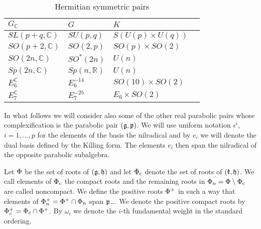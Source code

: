 \begin{table}[H]\label{fig:herm_pairs}
\begin{center}%
\begin{tabular}{llll}
$G_\mathbb{C}$ & {\centering $G$ }&  $K$\\\hline
$SL(p+q,\mathbb{C})$ & $SU(p,q)$ &$S(U(p)\times U(q))$\\
$SO(p+2,\mathbb{C})$ &  $SO(2,p)$ & $SO(p)\times SO(2)$\\
$SO(2n,\mathbb{C})$ &   $SO^*(2n)$ & $U(n)$\\
$Sp(2n,\mathbb{C})$ &   $Sp(n,\mathbb{R})$ & $U(n)$\\
$E_6^\mathbb{C}$ &   $E_6^{-14}$& $SO(10)\times SO(2)$\\
$E_7^\mathbb{C}$ &  $E_7^{-25} $ & $E_6\times SO(2)$
\end{tabular}\caption{Hermitian symmetric pairs}
\end{center}
\end{table}

 In what follows we will consider also some of the other real parabolic pairs whose complexification is the parabolic pair $(\mathfrak{g},\mathfrak{p})$. We will use uniform notation $\epsilon^i$, $i=1,\ldots,p$ for the elements of the basis the nilradical and by $e_i$ we will denote the dual basis defined  by the Killing form. The elements $e_i$ then span the nilradical of the opposite parabolic subalgebra. %

Let $\Phi$ be the set of roots of $(\mathfrak{g},\mathfrak{h})$ and let $\Phi_c$ denote the set of roots of $(\mathfrak{k},\mathfrak{h})$. We call elements of $\Phi_c$ the compact roots and the remaining roots in $\Phi_n = \Phi \setminus \Phi_c$ are called noncompact. We define the positive roots $\Phi^+$ in such a way that elements of $\Phi_n^+ = \Phi^+ \cap \Phi_n$ span $\mathfrak{p}_-$. We denote the positive compact roots by $\Phi^+_c = \Phi_c \cap \Phi^+$. By $\omega_i$ we denote the $i$-th fundamental weight in the standard ordering.

